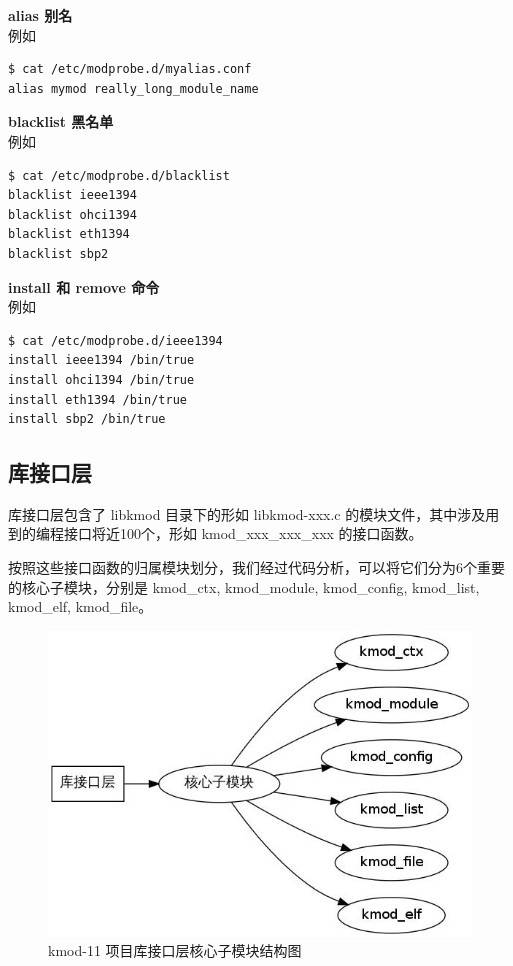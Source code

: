 \textbf{alias 别名}\\例如

{\begin{shaded}\begin{verbatim}
$ cat /etc/modprobe.d/myalias.conf
alias mymod really_long_module_name
\end{verbatim}\end{shaded}}
\textbf{blacklist 黑名单}\\例如

{\begin{shaded}\begin{verbatim}
$ cat /etc/modprobe.d/blacklist
blacklist ieee1394
blacklist ohci1394
blacklist eth1394
blacklist sbp2
\end{verbatim}\end{shaded}}
\textbf{install 和 remove 命令}\\例如

{\begin{shaded}\begin{verbatim}
$ cat /etc/modprobe.d/ieee1394
install ieee1394 /bin/true
install ohci1394 /bin/true
install eth1394 /bin/true
install sbp2 /bin/true
\end{verbatim}\end{shaded}}
\subsection{库接口层}

库接口层包含了 libkmod 目录下的形如 libkmod-xxx.c
的模块文件，其中涉及用到的编程接口将近100个，形如 kmod\_xxx\_xxx\_xxx
的接口函数。

按照这些接口函数的归属模块划分，我们经过代码分析，可以将它们分为6个重要的核心子模块，分别是
kmod\_ctx, kmod\_module, kmod\_config, kmod\_list, kmod\_elf,
kmod\_file。

\begin{figure}[htbp]
\centering
\includegraphics{./figures/2-core.jpg}
\caption{kmod-11 项目库接口层核心子模块结构图}
\end{figure}

